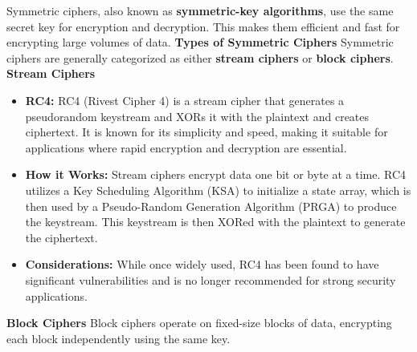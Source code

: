  Symmetric ciphers, also known as \textbf{symmetric-key algorithms}, use the same secret key for encryption and decryption. This makes them efficient and fast for encrypting large volumes of data.
\textbf{Types of Symmetric Ciphers}
Symmetric ciphers are generally categorized as either \textbf{stream ciphers} or \textbf{block ciphers}.
\textbf{Stream Ciphers}
\begin{itemize}
    \item \textbf{RC4:} RC4 (Rivest Cipher 4) is a stream cipher that generates a pseudorandom keystream and XORs it with the plaintext and creates ciphertext. It is known for its simplicity and speed, making it suitable for applications where rapid encryption and decryption are essential.
    \item \textbf{How it Works:} Stream ciphers encrypt data one bit or byte at a time. RC4 utilizes a Key Scheduling Algorithm (KSA) to initialize a state array, which is then used by a Pseudo-Random Generation Algorithm (PRGA) to produce the keystream. This keystream is then XORed with the plaintext to generate the ciphertext.
    \item \textbf{Considerations:} While once widely used, RC4 has been found to have significant vulnerabilities and is no longer recommended for strong security applications.
\end{itemize}
\textbf{Block Ciphers}
Block ciphers operate on fixed-size blocks of data, encrypting each block independently using the same key.
